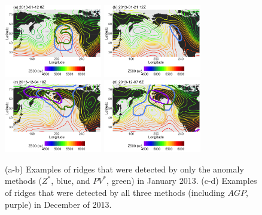 \documentclass[smallextended]{svjour3}       %
\numberwithin{equation}{section}
\begin{document}
\begin{figure}
\centering
\includegraphics[width=0.38\textwidth]{fig5a}
\includegraphics[width=0.38\textwidth]{fig5b}\\
\includegraphics[width=0.38\textwidth]{fig5c}
\includegraphics[width=0.38\textwidth]{fig5d}
\caption{(a-b) Examples of ridges that were detected by only the anomaly methods ($Z^*$, blue, and $PV^*$, green) in January 2013. (c-d) Examples of ridges that were detected by all three methods (including $AGP$, purple) in December of 2013.}\label{RRRpanel}
\end{figure}
\end{document}
